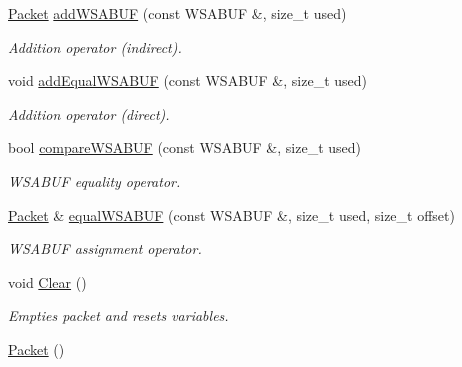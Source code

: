 \begin{DoxyCompactItemize}
\hyperlink{class_packet}{Packet} \hyperlink{class_packet_a908f6daabb43beabbae997008b257cf3}{addWSABUF} (const WSABUF \&, size\_\-t used)
\begin{DoxyCompactList}\small\item\em Addition operator (indirect). \item\end{DoxyCompactList}\item 
void \hyperlink{class_packet_a10eb8d42f70b985f311d4180bce14331}{addEqualWSABUF} (const WSABUF \&, size\_\-t used)
\begin{DoxyCompactList}\small\item\em Addition operator (direct). \item\end{DoxyCompactList}\item 
bool \hyperlink{class_packet_a9e3c011323e4805e3fd3ffc87560e8c9}{compareWSABUF} (const WSABUF \&, size\_\-t used)
\begin{DoxyCompactList}\small\item\em WSABUF equality operator. \item\end{DoxyCompactList}\item 
\hyperlink{class_packet}{Packet} \& \hyperlink{class_packet_a64281460528b923a5d151d2180cbd82f}{equalWSABUF} (const WSABUF \&, size\_\-t used, size\_\-t offset)
\begin{DoxyCompactList}\small\item\em WSABUF assignment operator. \item\end{DoxyCompactList}\item 
void \hyperlink{class_packet_a18fe5254e32ac247d9a254f0c713d6b6}{Clear} ()
\begin{DoxyCompactList}\small\item\em Empties packet and resets variables. \item\end{DoxyCompactList}\item 
\hypertarget{class_packet_aabcfb963c0d5bc0fa554668f92989622}{
\hyperlink{class_packet_aabcfb963c0d5bc0fa554668f92989622}{Packet} ()}
\label{class_packet_aabcfb963c0d5bc0fa554668f92989622}


\end{DoxyCompactItemize}
